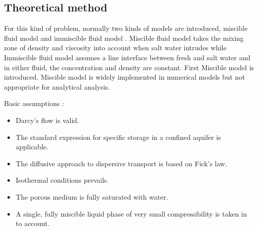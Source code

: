 \documentclass[review]{elsarticle}
\newcommand{\mbf}[1]{{\mathbf{#1}}}%
\begin{document}
\subsection{Theoretical method}
For this kind of problem, normally two kinds of models are introduced, miscible fluid model and immiscible fluid model \cite{volker1982assessment}. Miscible fluid model takes the mixing zone of density and viscosity into account when salt water intrudes while Immiscible fluid model assumes a line interface between fresh and salt water and in either fluid, the concentration and density are constant. 
First Miscible model is introduced. Miscible model is widely implemented in numerical models but not appropriate for analytical analysis. \par 
Basic assumptions \cite{guo2002user}: 
\begin{itemize}
\item Darcy's flow is valid.  
\item The standard expression for specific storage in a confined aquifer is applicable.
\item The diffusive approach to dispersive transport is based on Fick's law.
\item Isothermal conditions prevails. 
\item The porous medium is fully saturated with water.
\item A single, fully miscible liquid phase of very small compressibility is taken in to account. 
\end{itemize}


\end{document}
